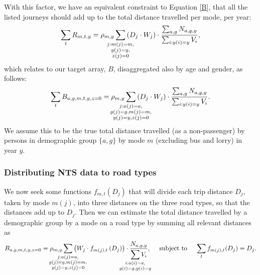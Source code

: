 \documentclass{article}
\begin{document}
With this factor, we have an equivalent constraint to Equation \ref{B}, that all the listed journeys should add up to the total distance travelled per mode, per year:
\begin{equation}\sum_{t}R_{m,t,y} = \rho_{m,y} \smashoperator{\sum_{\substack{j:m(j)=m,\\y(j)=y,\\z(j)=0}}}\left(D_{j}\cdot W_{j}\right)\cdot\frac{\sum_{a,g}N_{a,g,y}}{\sum_{i:y(i)=y}V_{i}},\end{equation}
which relates to our target array, $B$, disaggregated also by age and gender, as follows:
\begin{equation}\sum_{t}B_{a,g,m,t,y,z=0} = \rho_{m,y} \smashoperator{\sum_{\substack{j:a(j)=a,\\g(j)=g,m(j)=m,\\y(j)=y,z(j)=0}}}\left(D_{j}\cdot W_{j}\right)\cdot\frac{\sum_{a,g}N_{a,g,y}}{\sum_{i:y(i)=y}V_{i}}.\end{equation}
We assume this to be the true total distance travelled (as a non-passenger) by persons in demographic group $\{a,g\}$ by mode $m$ (excluding bus and lorry) in year $y$.


\subsubsection{Distributing NTS data to road types}\label{distribute}

We now seek some functions $f_{m,t}(D_j)$ that will divide each trip distance $D_j$, taken by mode $m(j)$, into three distances on the three road types, so that the distances add up to $D_j$. Then we can estimate the total distance travelled by a demographic group by a mode on a road type by summing all relevant distances as $$B_{a,g,m,t,y,z=0}= \rho_{m,y}
\smashoperator{\sum_{\substack{j:a(j)=a,\\g(j)=g,m(j)=m,\\y(j)=y,z(j)=0}}}\left(W_j\cdot f_{m(j),t}\left(D_{j}\right)\right)\cdot
\frac{N_{a,g,y}}
{\smashoperator{\sum_{\substack{i:a(i)=a,\\g(i)=g,y(i)=y}}}V_{i}},
\quad  \text{ subject to } \quad\sum_t f_{m(j),t}(D_j)=D_j.$$
\end{document}
